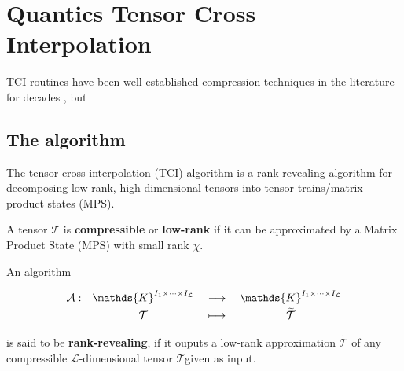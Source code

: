 \chapter{Quantics Tensor Cross Interpolation}
\label{chap:QTCI}

TCI routines have been well-established compression techniques in the literature for decades \cite{Oseledets2010, Dolgov2020, Savostyanov2011, Savostyanov2014, Fernandez2022, Fernandez2024}, but 

\section{The algorithm}

The tensor cross interpolation (TCI) algorithm is a rank-revealing algorithm for decomposing low-rank, high-dimensional tensors into tensor trains/matrix product states (MPS).

\begin{definition}
	A tensor $\mathcal{T}$ is {\normalfont \textbf{compressible}} or {\normalfont \textbf{low-rank}} if it can be approximated by a Matrix Product State (MPS) with small rank $\chi$.
	\label{def:compresstensor}
\end{definition}

\begin{definition}
	An algorithm 
	
	\[
		\renewcommand{\arraystretch}{1.1}%
		\begin{array}{r c >{{}}c<{{}} c} 
		\mathcal{A}: &
		\mathds{K}^{I_1 \times \dots \times I_\mathcal{L}} &
		\longrightarrow &
		\mathds{K}^{I_1 \times \dots \times I_\mathcal{L}} \\[2pt]
		& \mathcal{T} &
		\longmapsto &
		\widetilde{\mathcal{T}}
		\end{array}
	\]

	is said to be {\normalfont \textbf{rank-revealing}}, if it ouputs a low-rank approximation $\widetilde{\mathcal{T}}$ of any compressible $\mathcal{L}$-dimensional tensor $\mathcal{T}$\footnotemark given as input.
	\label{def:rkralg}
\end{definition}




